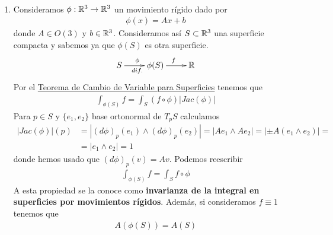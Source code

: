 \begin{ejemplo}\
    \begin{enumerate}
        \item Consideramos $\phi: \mathbb{R}^3 \to \mathbb{R}^3$ un movimiento rígido dado por 
        \begin{gather*}
            \phi(x) = Ax + b 
        \end{gather*}
        donde $A\in O(3)$ y $b\in \mathbb{R}^3$. Consideramos así $S\subset \mathbb{R}^3$ una superficie compacta y sabemos ya que $\phi(S)$ es otra superficie.
        \begin{gather*}
            \xymatrix{
                S \ar[r]^{\phi}_{dif.} & \phi(S) \ar[r]^f & \bb{R}
            }
        \end{gather*}
        Por el \hyperref[teo:cambio_variable_teo:cambio_variable_integral_sup]{Teorema de Cambio de Variable para Superficies} tenemos que 
        \begin{gather*}
            \int_{\phi(S)} f = \int_S (f\circ \phi)|Jac(\phi)|
        \end{gather*} 
        Para $p\in S$ y $\{e_1, e_2\}$ base ortonormal de $T_pS$ calculamos
        \begin{align*}
            |Jac(\phi)|(p) &= 
            |(d\phi)_p(e_1)\wedge(d\phi)_p(e_2)| = 
            |Ae_1 \wedge Ae_2| = 
            |\pm A(e_1\wedge e_2)| = \\
            &=
            |e_1\wedge e_2| = 1
        \end{align*}
        donde hemos usado que $(d\phi)_p(v) = Av$. Podemos reescribir
        \begin{gather*}
            \boxed{\int_{\phi(S)} f = \int_S f\circ \phi}
        \end{gather*}
        A esta propiedad se la conoce como \textbf{invarianza de la integral en superficies por movimientos rígidos}. Además, si consideramos $f\equiv 1$ tenemos que 
        \begin{gather*}
            \boxed{A(\phi(S)) = A(S)}
        \end{gather*}


\end{enumerate}
\end{ejemplo}
